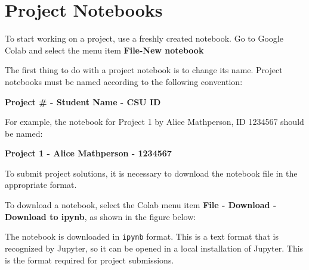 \documentclass[12pt]{article}
\begin{document}
\section{Project Notebooks}

To start working on a project, use a freshly created notebook. Go to Google Colab and select the menu item \textbf{File-New notebook}

The first thing to do with a project notebook is to change its name. Project notebooks must be named according to the following convention:

\begin{center}
\textbf{Project \# - Student Name - CSU ID}
\end{center}

For example, the notebook for Project 1 by Alice Mathperson, ID 1234567 should be named:

\begin{center}
\textbf{Project 1 - Alice Mathperson - 1234567}
\end{center}

To submit project solutions, it is necessary to download the notebook file in the appropriate format.

To download a notebook, select the Colab menu item \textbf{File - Download - Download to ipynb}, as shown in the figure below:



The notebook is downloaded in \texttt{ipynb} format. This is a text format that is recognized by Jupyter, so it can be opened in a local installation of Jupyter. This is the format required for project submissions.
\end{document}
